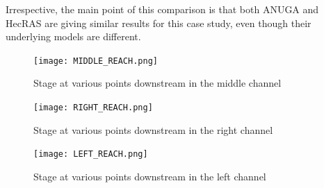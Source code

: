 Irrespective, the main point of this comparison is that both ANUGA and HecRAS
are giving similar results for this case study, even though their underlying
models are different.


\begin{figure}
\begin{center}
\texttt{[image: MIDDLE\_REACH.png]}
\end{center}
\caption{Stage at various points downstream in the middle channel}
\label{midReach}
\end{figure}

\begin{figure}
\begin{center}
\texttt{[image: RIGHT\_REACH.png]}
\end{center}
\caption{Stage at various points downstream in the right channel}
\end{figure}

\begin{figure}
\begin{center}
\texttt{[image: LEFT\_REACH.png]}
\end{center}
\caption{Stage at various points downstream in the left channel}
\label{leftReach}
\end{figure}


\endinput
